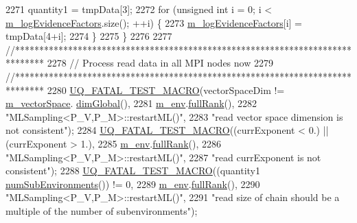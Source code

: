 \begin{DoxyCode}
2271     quantity1      = tmpData[3];
2272     \textcolor{keywordflow}{for} (\textcolor{keywordtype}{unsigned} \textcolor{keywordtype}{int} i = 0; i < \hyperlink{class_q_u_e_s_o_1_1_m_l_sampling_a75f2ceab4a2c6774b3fa07d74221dbf3}{m\_logEvidenceFactors}.size(); ++i) \{
2273       \hyperlink{class_q_u_e_s_o_1_1_m_l_sampling_a75f2ceab4a2c6774b3fa07d74221dbf3}{m\_logEvidenceFactors}[i] = tmpData[4+i];
2274     \}
2275   \}
2276 
2277   \textcolor{comment}{//******************************************************************************}
2278   \textcolor{comment}{// Process read data in all MPI nodes now}
2279   \textcolor{comment}{//******************************************************************************}
2280   \hyperlink{_defines_8h_a56d63d18d0a6d45757de47fcc06f574d}{UQ\_FATAL\_TEST\_MACRO}(vectorSpaceDim != \hyperlink{class_q_u_e_s_o_1_1_m_l_sampling_a7bc4c72f65ba9166ed94a6e198b0915b}{m\_vectorSpace}.
      \hyperlink{class_q_u_e_s_o_1_1_vector_space_acd4359dc120905c22ca1064e33787239}{dimGlobal}(),
2281                       \hyperlink{class_q_u_e_s_o_1_1_m_l_sampling_a13f1ca4fe9f94822fe572a743eaced1d}{m\_env}.\hyperlink{class_q_u_e_s_o_1_1_base_environment_a84a239e42ae443cf71db6e03e8159620}{fullRank}(),
2282                       \textcolor{stringliteral}{"MLSampling<P\_V,P\_M>::restartML()"},
2283                       \textcolor{stringliteral}{"read vector space dimension is not consistent"});
2284   \hyperlink{_defines_8h_a56d63d18d0a6d45757de47fcc06f574d}{UQ\_FATAL\_TEST\_MACRO}((currExponent < 0.) || (currExponent > 1.),
2285                       \hyperlink{class_q_u_e_s_o_1_1_m_l_sampling_a13f1ca4fe9f94822fe572a743eaced1d}{m\_env}.\hyperlink{class_q_u_e_s_o_1_1_base_environment_a84a239e42ae443cf71db6e03e8159620}{fullRank}(),
2286                       \textcolor{stringliteral}{"MLSampling<P\_V,P\_M>::restartML()"},
2287                       \textcolor{stringliteral}{"read currExponent is not consistent"});
2288   \hyperlink{_defines_8h_a56d63d18d0a6d45757de47fcc06f574d}{UQ\_FATAL\_TEST\_MACRO}((quantity1 %
      \hyperlink{class_q_u_e_s_o_1_1_base_environment_ac0345f57e31ef7833e379ed972bd094d}{numSubEnvironments}()) != 0,
2289                       \hyperlink{class_q_u_e_s_o_1_1_m_l_sampling_a13f1ca4fe9f94822fe572a743eaced1d}{m\_env}.\hyperlink{class_q_u_e_s_o_1_1_base_environment_a84a239e42ae443cf71db6e03e8159620}{fullRank}(),
2290                       \textcolor{stringliteral}{"MLSampling<P\_V,P\_M>::restartML()"},
2291                       \textcolor{stringliteral}{"read size of chain should be a multiple of the number of subenvironments"});

\end{DoxyCode}
